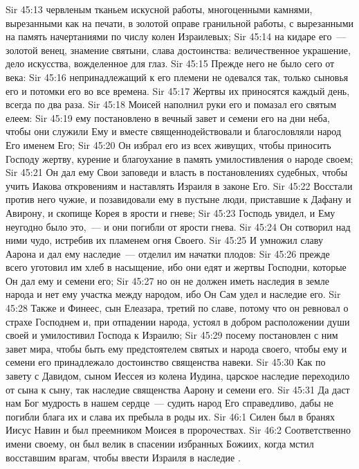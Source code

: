 \vs Sir 45:13 червленым тканьем искусной работы, многоценными камнями, вырезанными как на печати, в золотой оправе гранильной работы, с вырезанными на память начертаниями  по числу колен Израилевых;
\vs Sir 45:14 на кидаре его~--- золотой венец, знамение святыни, слава достоинства: величественное украшение, дело искусства, вожделенное для глаз.
\vs Sir 45:15 Прежде него не было сего от века:
\vs Sir 45:16 непринадлежащий к его племени не одевался так, только сыновья его и потомки его во все времена.
\vs Sir 45:17 Жертвы их приносятся каждый день, всегда по два раза.
\vs Sir 45:18 Моисей наполнил руки его и помазал его святым елеем:
\vs Sir 45:19 ему постановлено в вечный завет и семени его на дни неба, чтобы они служили Ему и вместе священнодействовали и благословляли народ Его именем Его;
\vs Sir 45:20 Он избрал его из всех живущих, чтобы приносить Господу жертву, курение и благоухание в память умилостивления о народе своем;
\vs Sir 45:21 Он дал ему Свои заповеди и власть в постановлениях судебных, чтобы учить Иакова откровениям и наставлять Израиля в законе Его.
\vs Sir 45:22 Восстали против него чужие, и позавидовали ему в пустыне люди, приставшие к Дафану и Авирону, и скопище Корея в ярости и гневе;
\vs Sir 45:23 Господь увидел, и Ему неугодно было это,~--- и они погибли от ярости гнева.
\vs Sir 45:24 Он сотворил над ними чудо, истребив их пламенем огня Своего.
\vs Sir 45:25 И умножил славу Аарона и дал ему наследие~--- отделил им начатки плодов:
\vs Sir 45:26 прежде всего уготовил им хлеб в насыщение, ибо они едят и жертвы Господни, которые Он дал ему и семени его;
\vs Sir 45:27 но он не должен иметь наследия в земле народа и нет ему участка между народом, ибо Он Сам удел и наследие его.
\vs Sir 45:28 Также и Финеес, сын Елеазара, третий по славе, потому что он ревновал о страхе Господнем и, при отпадении народа, устоял в добром расположении души своей и умилостивил Господа к Израилю;
\vs Sir 45:29 посему постановлен с ним завет мира, чтобы быть ему предстоятелем святых и народа своего, чтобы ему и семени его принадлежало достоинство священства навеки.
\vs Sir 45:30 Как по завету с Давидом, сыном Иессея из колена Иудина, царское наследие переходило от сына к сыну, так наследие священства  Аарону и семени его.
\vs Sir 45:31 Да даст нам Бог мудрость в нашем сердце~--- судить народ Его справедливо, дабы не погибли блага их и слава их пребыла в роды их.
\vs Sir 46:1 Силен был в бранях Иисус Навин и был преемником Моисея в пророчествах.
\vs Sir 46:2 Соответственно имени своему, он был велик в спасении избранных Божиих, когда мстил восставшим врагам, чтобы ввести Израиля в наследие .
